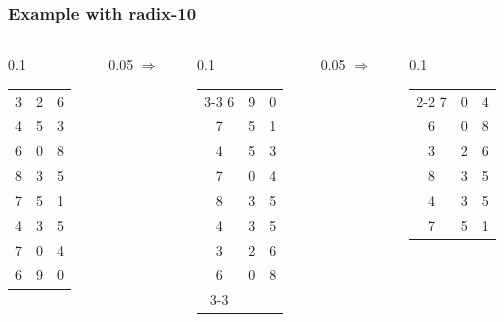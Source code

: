 \begin{frame}
  \frametitle{Example with radix-10}

  \addtolength{\tabcolsep}{-5pt}

\bigskip
  \begin{columns}
    \begin{column}{0.1\textwidth}
      \begin{tabular}{*3{c}}
        3 & 2 & 6 \\
        4 & 5 & 3 \\
        6 & 0 & 8 \\
        8 & 3 & 5 \\
        7 & 5 & 1 \\
        4 & 3 & 5 \\
        7 & 0 & 4 \\
        6 & 9 & 0 \\
      \end{tabular}
    \end{column}
    \begin{column}{0.05\textwidth}
      $\Rightarrow$
    \end{column}
    \begin{column}{0.1\textwidth}
      \begin{tabular}{cc|c|}
        \cline{3-3}
        6 & 9 & 0 \\
        7 & 5 & 1 \\
        4 & 5 & 3 \\
        7 & 0 & 4 \\
        8 & 3 & 5 \\
        4 & 3 & 5 \\
        3 & 2 & 6 \\
        6 & 0 & 8 \\
        \cline{3-3}
      \end{tabular}
    \end{column}
    \begin{column}{0.05\textwidth}
      $\Rightarrow$
    \end{column}
    \begin{column}{0.1\textwidth}
      \begin{tabular}{c|c|c}
        \cline{2-2}
        7 & 0 & 4 \\
        6 & 0 & 8 \\
        3 & 2 & 6 \\
        8 & 3 & 5 \\
        4 & 3 & 5 \\
        7 & 5 & 1 \\

\end{tabular}
\end{column}
\end{columns}
\end{frame}
